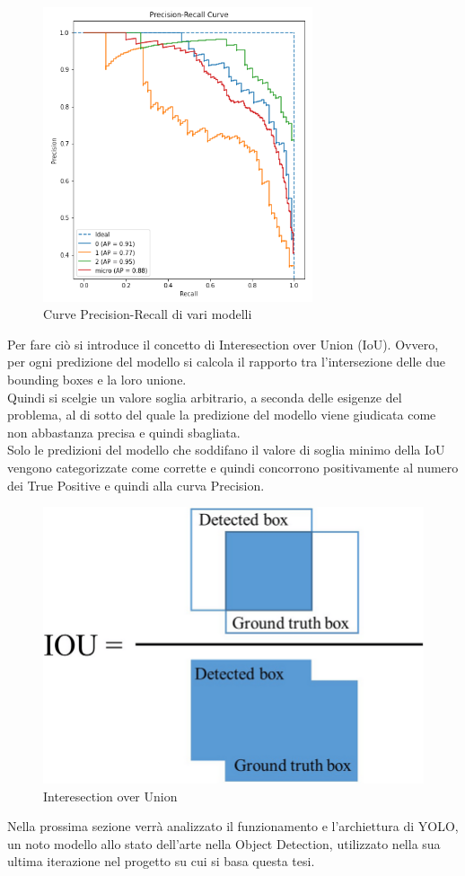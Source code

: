 \documentclass[12pt,a4paper,openright,twoside]{report}
\begin{document}
\begin{figure}[h]
\centering
\includegraphics[width=300px,keepaspectratio]{precisionRecall2.png}
\caption{Curve Precision-Recall di vari modelli}
\end{figure}
\newpage
Per fare ciò si introduce il concetto di Interesection over Union (IoU). Ovvero, per ogni predizione del modello si calcola il rapporto tra l'intersezione delle due bounding boxes e la loro unione. \\
Quindi si scelgie un valore soglia arbitrario, a seconda delle esigenze del problema, al di sotto del quale la predizione del modello viene giudicata come non abbastanza precisa e quindi sbagliata. 
\\ Solo le predizioni del modello che soddifano il valore di soglia minimo della IoU vengono categorizzate come corrette e quindi concorrono positivamente al numero dei True Positive e quindi alla curva Precision.
\begin{figure}[h]
\centering
\includegraphics[width=\linewidth]{IoU.png}
\caption{Interesection over Union}
\end{figure}
Nella prossima sezione verrà analizzato il funzionamento e l'archiettura di YOLO, un noto modello allo stato dell'arte nella Object Detection, utilizzato nella sua ultima iterazione nel progetto su cui si basa questa tesi.
\newpage
\end{document}

